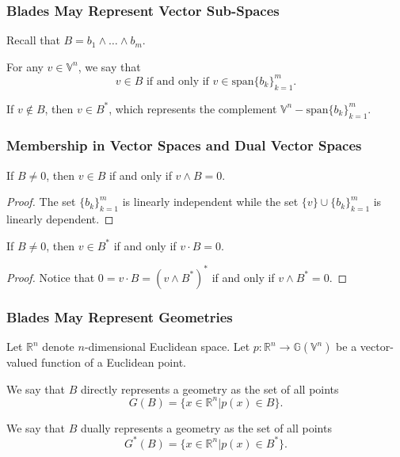 \documentclass{beamer}
\newcommand{\G}{\mathbb{G}}
\newcommand{\V}{\mathbb{V}}
\newcommand{\R}{\mathbb{R}}
\begin{document}
\begin{frame}
\frametitle{Blades May Represent Vector Sub-Spaces}
Recall that $B = b_1\wedge\dots\wedge b_m$.
\begin{definition}
For any $v\in\V^n$, we say that
\begin{equation*}
\mbox{$v\in B$ if and only if $v\in\mbox{span}\{b_k\}_{k=1}^m$}.
\end{equation*}
\end{definition}
\begin{definition}
If $v\not\in B$, then $v\in B^*$, which represents the complement $\V^n-\mbox{span}\{b_k\}_{k=1}^m$.
\end{definition}
\end{frame}

\begin{frame}
\frametitle{Membership in Vector Spaces and Dual Vector Spaces}
If $B\neq 0$, then $v\in B$ if and only if $v\wedge B=0$.
\begin{proof}
The set $\{b_k\}_{k=1}^m$ is linearly independent while the set $\{v\}\cup\{b_k\}_{k=1}^m$ is linearly dependent.
\end{proof}
If $B\neq 0$, then $v\in B^*$ if and only if $v\cdot B=0$.
\begin{proof}
Notice that $0=v\cdot B=(v\wedge B^*)^*$ if and only if $v\wedge B^*=0$.
\end{proof}
\end{frame}

\begin{frame}
\frametitle{Blades May Represent Geometries}
Let $\R^n$ denote $n$-dimensional Euclidean space.
Let $p:\R^n\to\G(\V^n)$ be a vector-valued function of a Euclidean point.
\begin{definition}
We say that $B$ \alert{directly} represents a geometry as the
set of all points
\begin{equation*}
G(B) = \{x\in\R^n|p(x)\in B\}.
\end{equation*}
\end{definition}
\begin{definition}
We say that $B$ \alert{dually} represents a geometry as the
set of all points
\begin{equation*}
G^*(B) = \{x\in\R^n|p(x)\in B^*\}.
\end{equation*}
\end{definition}
\end{frame}
\end{document}
